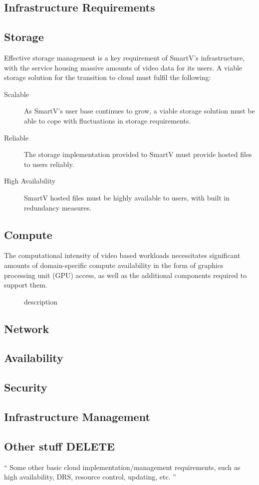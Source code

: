 \subsection{Infrastructure Requirements}


\subsection{Storage}

Effective storage management is a key requirement of SmartV's infrastructure, with the service housing massive amounts of video data for its users. A viable storage solution for the transition to cloud must fulfil the following:

\begin{description}
    \item[Scalable] As SmartV's user base continues to grow, a viable storage solution must be able to cope with fluctuations in storage requirements.
    \item[Reliable] The storage implementation provided to SmartV must provide hosted files to users reliably.
    \item[High Availability] SmartV hosted files must be highly available to users, with built in redundancy measures.
\end{description}



\subsection{Compute}

The computational intensity of video based workloads necessitates significant amounts of domain-specific compute availability in the form of graphics processing unit (GPU) access, as well as the additional components required to support them. 

\begin{description}
    \item[] description
\end{description}

\subsection{Network}

\subsection{Availability}

\subsection{Security}

\subsection{Infrastructure Management}

\subsection{Other stuff DELETE}
`` Some other basic cloud implementation/management requirements, such as high availability, DRS,
resource control, updating, etc. ''